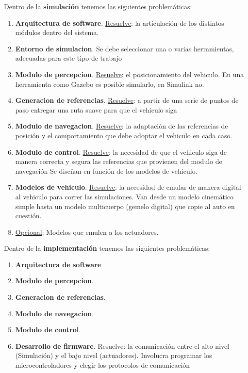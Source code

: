 \documentclass[12pt,a4paper,fleqn]{report}
\begin{document}
	Dentro de la \textbf{simulación} tenemos las siguientes problemáticas:
	\begin{enumerate}
		\item \textbf{Arquitectura de software}. \underline{Resuelve}: la articulación de los distintos módulos dentro del sistema.
		\item\textbf{Entorno de simulacion}. Se debe seleccionar una o varias herramientas, adecuadas para este tipo de trabajo
		\item\textbf{Modulo de percepcion}. \underline{Resuelve}: el posicionamiento del vehiculo. En una herramienta como Gazebo es posible simularlo, en Simulink no.
		\item \textbf{Generacion de referencias}. \underline{Resuelve}: a partir de una serie de puntos de paso entregar una ruta suave para que el vehiculo siga
		\item \textbf{Modulo de navegacion}. \underline{Resuelve}: la adaptación de las referencias de posición y el comportamiento que debe adoptar el vehiculo en cada caso.
		\item \textbf{Modulo de control}. \underline{Resuelve}: la necesidad de que el vehiculo siga de manera correcta y segura las referencias que provienen del modulo de navegación Se diseñan en función de los modelos de vehiculo.
		\item \textbf{Modelos de vehiculo}. \underline{Resuelve}: la necesidad de emular de manera digital al vehiculo para correr las simulaciones. Van desde un modelo cinemático simple hasta un modelo multicuerpo (gemelo digital) que copie al auto en cuestión.
		\item \underline{Opcional}: Modelos que emulen a los actuadores. 	
	\end{enumerate}

\vspace{1em}
Dentro de la \textbf{implementación} tenemos las siguientes problemáticas:
\begin{enumerate}
	\item\textbf{Arquitectura de software}
	\item\textbf{Modulo de percepcion}.
	\item\textbf{Generacion de referencias}.
	\item\textbf{Modulo de navegacion}.
	\item\textbf{Modulo de control}.
	\item\textbf{Desarrollo de firmware}. Resuelve: la comunicación entre el alto nivel (Simulación) y el bajo nivel (actuadores). Involucra programar los microcontroladores y elegir los protocolos de comunicación  	
\end{enumerate}
\end{document}
